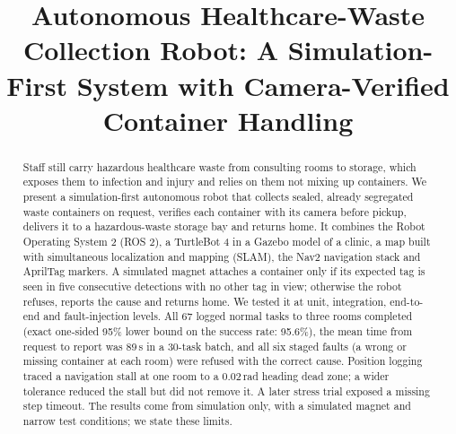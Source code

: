 \documentclass[conference]{IEEEtran}
\begin{document}
\title{Autonomous Healthcare-Waste Collection Robot: A Simulation-First System with Camera-Verified Container Handling}

\author{
\and
{}
\and
{}
}

\maketitle

\begin{abstract}
Staff still carry hazardous healthcare waste from consulting rooms to storage, which exposes them to infection and injury and relies on them not mixing up containers. We present a simulation-first autonomous robot that collects sealed, already segregated waste containers on request, verifies each container with its camera before pickup, delivers it to a hazardous-waste storage bay and returns home. It combines the Robot Operating System 2 (ROS 2), a TurtleBot 4 in a Gazebo model of a clinic, a map built with simultaneous localization and mapping (SLAM), the Nav2 navigation stack and AprilTag markers. A simulated magnet attaches a container only if its expected tag is seen in five consecutive detections with no other tag in view; otherwise the robot refuses, reports the cause and returns home. We tested it at unit, integration, end-to-end and fault-injection levels. All 67 logged normal tasks to three rooms completed (exact one-sided 95\% lower bound on the success rate: 95.6\%), the mean time from request to report was 89\,s in a 30-task batch, and all six staged faults (a wrong or missing container at each room) were refused with the correct cause. Position logging traced a navigation stall at one room to a 0.02\,rad heading dead zone; a wider tolerance reduced the stall but did not remove it. A later stress trial exposed a missing step timeout. The results come from simulation only, with a simulated magnet and narrow test conditions; we state these limits.
\end{abstract}
\end{document}
